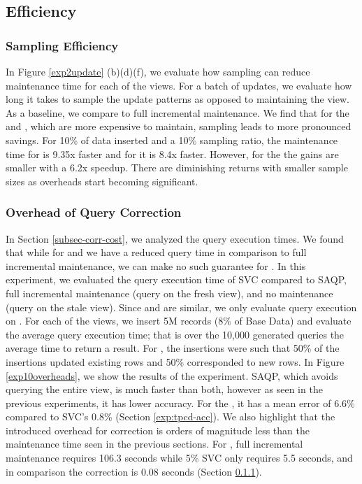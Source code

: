 \subsection{Efficiency}
\vspace{-.5em}
\subsubsection{Sampling Efficiency}\label{exp:tpcd-eff}
In Figure \ref{exp2update} (b)(d)(f), we evaluate how sampling can reduce maintenance time for each of the views.
For a batch of updates, we evaluate how long it takes to sample the update patterns as opposed to maintaining the view.
As a baseline, we compare to full incremental maintenance.
We find that for the \aggview and \fjview, which are more expensive to maintain, sampling leads to more pronounced savings. 
For 10\% of data inserted and a 10\% sampling ratio, the maintenance time for \fjview  is 9.35x faster and for \aggview it is 8.4x faster.
However, for the \spview the gains are smaller with a 6.2x speedup.
There are diminishing returns with smaller sample sizes as overheads start becoming significant. 

\subsubsection{Overhead of Query Correction}
In Section \ref{subsec-corr-cost}, we analyzed the query execution times.
We found that while for \spview and \fjview we have a reduced query time in comparison to full incremental maintenance, we can make no such
guarantee for \aggview.
In this experiment, we evaluated the query execution time of SVC compared to SAQP, full incremental maintenance (query on the fresh view), and no maintenance (query on the stale view).
Since \spview and \fjview are similar, we only evaluate query execution on \fjview.
For each of the views, we insert 5M records (8\% of Base Data) and evaluate the average query execution time; that is over the 10,000 generated queries the average time to return a result. 
For \aggview, the insertions were such that 50\% of the insertions updated existing rows and 50\% corresponded to new rows.
In Figure \ref{exp10overheads}, we show the results of the experiment.
SAQP, which avoids querying the entire view, is much faster than both, however as seen in the previous experiments, it has lower accuracy. 
For the \aggview, it has a mean error of 6.6\% compared to SVC's 0.8\% (Section \ref{exp:tpcd-acc}).
We also highlight that the introduced overhead for correction is orders of magnitude less than the maintenance time seen in the previous sections.
For \aggview, full incremental maintenance requires 106.3 seconds while 5\% SVC only requires 5.5 seconds, and in comparison the correction is 0.08 seconds (Section \ref{exp:tpcd-eff}).

